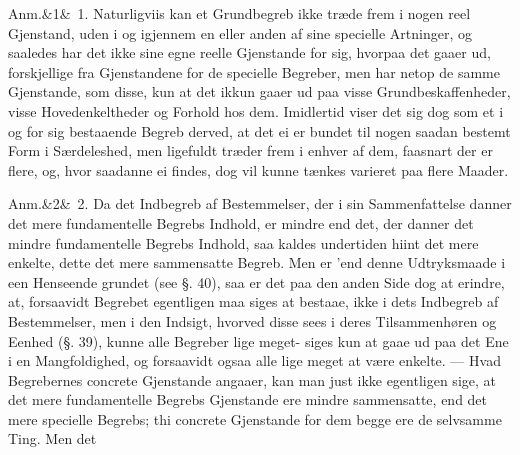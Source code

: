 \documentclass[12pt]{book}
\def\sperr#1{#1}%
\def\textit#1{#1}%
\def\emph#1{#1}%
\newcommand{\sperr}[1]{\textls[180]{#1}}
\newcommand{\anm}[1]{%
  \par\vspace{0.5\baselineskip}%
  \noindent\hspace{\parindent}\sperr{Anm.}\ifx&#1&\else~\textit{#1}.\fi
  \enspace\ignorespaces
}
\newcommand{\opage}[1]{\marginnote{\footnotesize\textit{[#1]}}}
\begin{document}
\anm{1} Naturligviis kan et Grundbegreb ikke træde frem i nogen reel Gjenstand, uden
i og igjennem en eller anden af sine specielle Artninger, og saaledes har det ikke
sine egne reelle Gjenstande for sig, hvorpaa det gaaer ud, forskjellige fra
Gjenstandene for de specielle Begreber, men har netop de samme Gjenstande, som disse,
kun at det ikkun gaaer ud paa visse Grundbeskaffenheder, visse Hovedenkeltheder og
Forhold hos dem. Imidlertid viser det sig dog som et i og for sig bestaaende Begreb
derved, at det ei er bundet til nogen saadan bestemt Form i Særdeleshed, men
ligefuldt træder frem i enhver af dem, faasnart der er flere, og, hvor saadanne ei
findes, dog vil kunne tænkes varieret paa flere Maader.
\opage{139} \anm{2} Da det Indbegreb af Bestemmelser, der i sin Sammenfattelse danner det mere
fundamentelle Begrebs Indhold, er mindre end det, der danner det mindre fundamentelle
Begrebs Indhold, saa kaldes undertiden hiint det \emph{mere enkelte}, dette det
\emph{mere sammensatte} Begreb. Men er 'end denne Udtryksmaade i een Henseende
grundet (see §. 40), saa er det paa den anden Side dog at erindre, at, forsaavidt
Begrebet egentligen maa siges at bestaae, ikke i dets Indbegreb af Bestemmelser, men
i den Indsigt, hvorved disse sees i deres Tilsammenhøren og Eenhed (§. 39), kunne
alle Begreber lige meget- siges kun at gaae ud paa det \emph{Ene} i en Mangfoldighed,
og forsaavidt ogsaa alle lige meget at være enkelte. --- Hvad Begrebernes
\emph{concrete} Gjenstande angaaer, kan man just ikke egentligen sige, at det mere
fundamentelle Begrebs Gjenstande ere mindre sammensatte, end det mere specielle
Begrebs; thi \emph{concrete} Gjenstande for dem begge ere de selvsamme Ting. Men det
\end{document}
